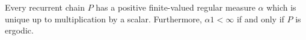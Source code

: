 Every recurrent chain $P$ has a positive finite-valued regular measure $\alpha$ which is unique up to multiplication by a scalar. Furthermore, $\alpha 1 < \infty$ if and only if $P$ is ergodic.
